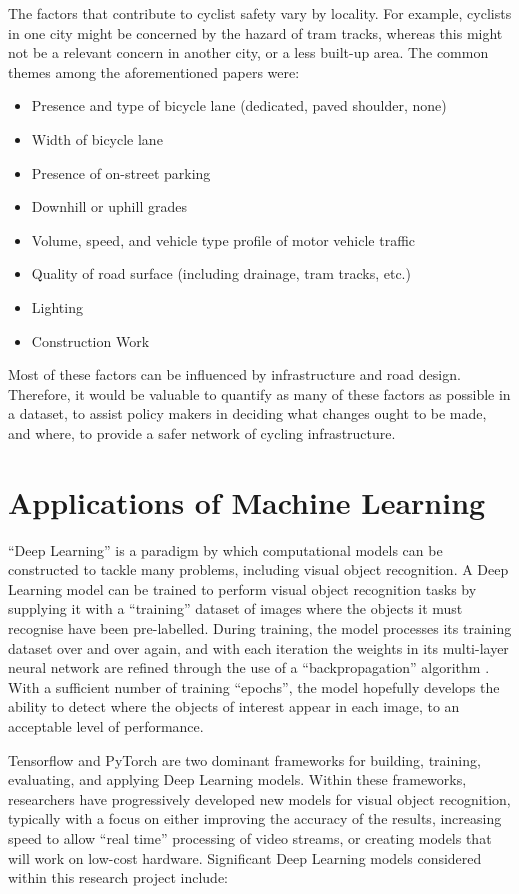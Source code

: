 \documentclass[11pt,twoside]{report}
\begin{document}
The factors that contribute to cyclist safety vary by locality.  For example, cyclists in one city might be concerned by the hazard of tram tracks, whereas this might not be a relevant concern in another city, or a less built-up area.  The common themes among the aforementioned papers were:
\begin{itemize}
\item{Presence and type of bicycle lane (dedicated, paved shoulder, none)}
\item{Width of bicycle lane}
\item{Presence of on-street parking}
\item{Downhill or uphill grades}
\item{Volume, speed, and vehicle type profile of motor vehicle traffic}
\item{Quality of road surface (including drainage, tram tracks, etc.)}
\item{Lighting}
\item{Construction Work}
\end{itemize}
Most of these factors can be influenced by infrastructure and road design.  Therefore, it would be valuable to quantify as many of these factors as possible in a dataset, to assist policy makers in deciding what changes ought to be made, and where, to provide a safer network of cycling infrastructure.

\section{Applications of Machine Learning}

``Deep Learning'' is a paradigm by which computational models can be constructed to tackle many problems, including visual object recognition.  A Deep Learning model can be trained to perform visual object recognition tasks by supplying it with a ``training'' dataset of images where the objects it must recognise have been pre-labelled.  During training, the model processes its training dataset over and over again, and with each iteration the weights in its multi-layer neural network are refined through the use of a ``backpropagation'' algorithm \cite{deeplearning}.  With a sufficient number of training ``epochs'', the model hopefully develops the ability to detect where the objects of interest appear in each image, to an acceptable level of performance.

Tensorflow \cite{TENSORFLOW2016A} \cite{TENSORFLOW2016B} and PyTorch \cite{pytorch} are two dominant frameworks for building, training, evaluating, and applying Deep Learning models.  Within these frameworks, researchers have progressively developed new models for visual object recognition, typically with a focus on either improving the accuracy of the results, increasing speed to allow ``real time'' processing of video streams, or creating models that will work on low-cost hardware.  Significant Deep Learning models considered within this research project include:
\end{document}

